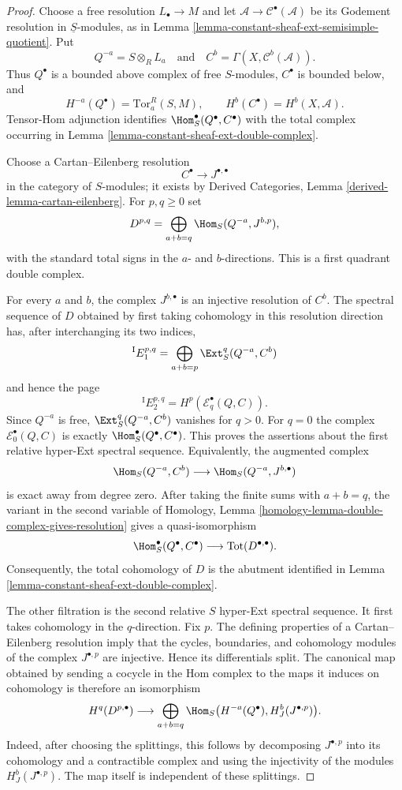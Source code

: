 \begin{proof}
Choose a free resolution $L_\bullet \to M$ and let
$\mathcal{A} \to \mathcal{C}^\bullet(\mathcal{A})$ be its Godement
resolution in $\underline{S}$-modules, as in
Lemma \ref{lemma-constant-sheaf-ext-semisimple-quotient}. Put
$$
Q^{-a} = S \otimes_R L_a
\quad\text{and}\quad
C^b = \Gamma(X, \mathcal{C}^b(\mathcal{A})).
$$
Thus $Q^\bullet$ is a bounded above complex of free $S$-modules,
$C^\bullet$ is bounded below, and
$$
H^{-a}(Q^\bullet) = \text{Tor}_a^R(S, M),
\qquad
H^b(C^\bullet) = H^b(X, \mathcal{A}).
$$
Tensor-Hom adjunction identifies
$\Hom_S^\bullet(Q^\bullet, C^\bullet)$ with the total complex occurring
in Lemma \ref{lemma-constant-sheaf-ext-double-complex}.

Choose a Cartan--Eilenberg resolution
$$
C^\bullet \longrightarrow J^{\bullet, \bullet}
$$
in the category of $S$-modules; it exists by Derived Categories,
Lemma \ref{derived-lemma-cartan-eilenberg}. For $p, q \geq 0$ set
$$
D^{p, q} =
\bigoplus_{a + b = q}
\Hom_S(Q^{-a}, J^{b, p}),
$$
with the standard total signs in the $a$- and $b$-directions. This is a
first quadrant double complex.

For every $a$ and $b$, the complex $J^{b, \bullet}$ is an injective
resolution of $C^b$. The spectral sequence of $D$ obtained by first taking
cohomology in this resolution direction has, after interchanging its two
indices,
$$
{}^{\mathrm I}E_1^{p, q} =
\bigoplus_{a + b = p}\Ext_S^q(Q^{-a}, C^b)
$$
and hence the page
$$
{}^{\mathrm I}E_2^{p, q} = H^p(\mathcal{E}_q^\bullet(Q, C)).
$$
Since $Q^{-a}$ is free, $\Ext_S^q(Q^{-a}, C^b)$ vanishes for $q > 0$.
For $q = 0$ the complex $\mathcal{E}_0^\bullet(Q, C)$ is exactly
$\Hom_S^\bullet(Q^\bullet, C^\bullet)$. This proves the assertions about
the first relative hyper-Ext spectral sequence. Equivalently, the augmented
complex
$$
\Hom_S(Q^{-a}, C^b)
\longrightarrow
\Hom_S(Q^{-a}, J^{b, \bullet})
$$
is exact away from degree zero. After taking the finite sums with
$a + b = q$, the variant in the second variable of Homology, Lemma
\ref{homology-lemma-double-complex-gives-resolution} gives a
quasi-isomorphism
$$
\Hom_S^\bullet(Q^\bullet, C^\bullet)
\longrightarrow
\text{Tot}(D^{\bullet, \bullet}).
$$
Consequently, the total cohomology of $D$ is the abutment identified in
Lemma \ref{lemma-constant-sheaf-ext-double-complex}.

The other filtration is the second relative $S$ hyper-Ext spectral
sequence. It first takes cohomology in the $q$-direction. Fix $p$.
The defining properties of a
Cartan--Eilenberg resolution imply that the cycles, boundaries, and
cohomology modules of the complex $J^{\bullet, p}$ are injective.
Hence its differentials split. The canonical map obtained by sending a
cocycle in the Hom complex to the maps it induces on cohomology is
therefore an isomorphism
$$
H^q(D^{p, \bullet})
\longrightarrow
\bigoplus_{a + b = q}
\Hom_S\bigl(
H^{-a}(Q^\bullet), H_J^b(J^{\bullet, p})
\bigr).
$$
Indeed, after choosing the splittings, this follows by decomposing
$J^{\bullet, p}$ into its cohomology and a contractible complex and
using the injectivity of the modules $H_J^b(J^{\bullet, p})$. The map
itself is independent of these splittings.


\end{proof}
